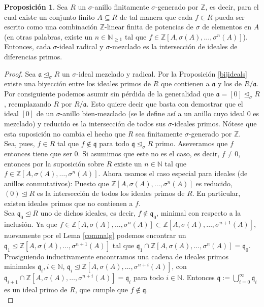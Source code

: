 \documentclass[letterpaper]{article}
\def\N{\mathbb{N}}
\def\NE{\mathbb{N}_{\geq 1}}
\def\Z{\mathbb{Z}}
\def\fa{\text{ para todo }}
\def\a{\mathfrak{a}}
\def\q{\mathfrak{q}}
\def\s{\sigma}
\def\si{\unlhd_{\sigma}}
\theoremstyle{definition}
\newtheorem{prop}[Satz]{Proposici\'{o}n}
\begin{document}
\begin{prop}\label{mixedintersectionprimesfinite}
Sea $R$ un $\sigma$-anillo finitamente $\sigma$-generado por $\Z$, es decir, para el cual existe un conjunto finito $A \subseteq R$ de tal manera que cada $f \in R$ pueda ser escrito como una combinaci\'on $\Z$-linear finita de potencias de $\sigma$ de elementos en $A$(en otras palabras, existe un $n \in \NE$ tal que $f \in \Z[A,\sigma(A),\ldots,\s^n(A)]$). Entonces, cada $\sigma$-ideal radical y $\sigma$-mezclado es la intersecci\'on de ideales de diferencias primos.

\end{prop}
\begin{proof}
Sea $\a \si R$ un $\sigma$-ideal mezclado y radical. Por la Proposici\'on \ref{bijideals} existe una biyecci\'on entre los ideales primos de $R$ que contienen a $\a$ y los de $R/\a$. Por consiguiente podemos asumir sin p\'erdida de la generalidad que $\a = [0] \si R$, reemplazando $R$ por $R/\a$. Esto quiere decir que basta con demostrar que el ideal $[0]$ de un $\sigma$-anillo bien-mezclado (se le define as\'i a un anillo cuyo ideal $0$ es mezclado) y reducido es la intersecci\'on de todos sus $\sigma$-ideales primos.
N\'otese que esta suposici\'on no cambia el hecho que $R$ sea finitamente $\sigma$-generado por $\Z$.\\

Sea, pues, $f \in R$ tal que $f \notin \q \fa \q \si R$ primo. Aseveramos que $f$ entonces tiene que ser $0$. Si asumimos que este no es el caso, es decir, $f \neq 0$, entonces por la suposici\'on sobre $R$ existe un $n \in \N$ tal que $f \in \Z[A,\s(A),\ldots,\s^n(A)]$.
Ahora usamos el caso especial para ideales (de anillos conmutativos): Puesto que $\Z[A,\s(A),\ldots,\s^n(A)]$ es reducido, $(0) \unlhd R$ es la intersecci\'on de todos los ideales primos de $R$. En particular, existen ideales primos que no contienen a $f$.\\

Sea $\q_0 \unlhd R$ uno de dichos ideales, es decir, $f \notin \q_0$, minimal con respecto a la inclusi\'on. Ya que $f \in \Z[A,\s(A),\ldots,\s^n(A)] \subset \Z[A,\s(A),\ldots,\s^{n+1}(A)]$, nuevamente por el Lema \ref{commalg} 
podemos encontrar un $\q_1 \unlhd \Z[A,\s(A),\ldots,\s^{n+1}(A)]$ tal que $\q_1 \cap \Z[A,\s(A),\ldots,\s^{n}(A)] = \q_0$. Prosiguiendo inductivamente encontramos una cadena de ideales primos minimales
 $\q_i, i \in \N$, $\q_i \unlhd \Z[A,\s(A),\ldots,\s^{n+i}(A)]$, con $\q_{i+1} \cap \Z[A,\s(A),\ldots,\s^{n+i}(A)] = \q_i$ para todo $i \in \N$.
Entonces $\q := \bigcup_{i=0}^{\infty} \q_i$ es un ideal primo de $R$, que cumple que $f \notin \q$. \\


\end{proof}
\end{document}
